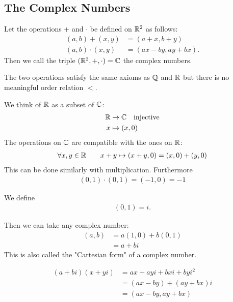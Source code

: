 \subsection{The Complex Numbers}

\begin{df}
	Let the operations + and $\cdot$ be defined on $\mathbb R^2$ as follows:
	\begin{align*}
	(a,b) + (x,y) & = (a+x, b+y) \\
	(a,b) \cdot (x,y) & = (ax-by, ay+bx).
	\end{align*}
	Then we call the triple $(\mathbb R^2, +, \cdot) =\mathbb C$ the complex numbers.
\end{df}

\begin{rk}
The two operations satisfy the same axioms as $\mathbb Q$ and $\mathbb R$ but there is no meaningful order relation $<$.
\end{rk}

We think of $\mathbb R$ as a subset of $\mathbb C$:
\begin{align*}
\mathbb R & \to \mathbb C \quad \text{injective} \\
x & \mapsto (x,0)
\end{align*}
The operations on $\mathbb C$ are compatible with the ones on $\mathbb R$:
\begin{align*}
\forall x,y \in \mathbb R \qquad x+y \mapsto (x+y,0) = (x,0) + (y,0)
\end{align*}
This can be done similarly with multiplication. Furthermore
\begin{align*}
(0,1) \cdot (0,1) = (-1,0) = -1
\end{align*}
\begin{df} We define
	\begin{align*}
	(0,1) = i.
	\end{align*}
\end{df}
Then we can take any complex number:
\begin{align*}
(a,b) & = a(1,0) + b(0,1) \\
& = a +bi
\end{align*}
This is also called the "Cartesian form" of a complex number.

\begin{ex}
	\begin{align*}
	(a+bi) (x+yi) & = ax+ ayi + bxi+ byi^2 \\
	& = (ax-by) +(ay+bx)i \\
	& = (ax-by, ay+bx) 
	\end{align*}
\end{ex} 

